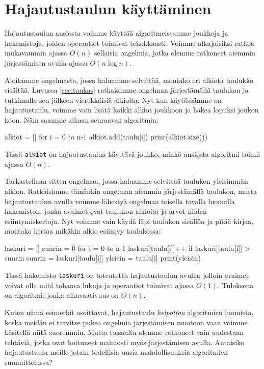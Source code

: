 \section{Hajautustaulun käyttäminen}

Hajautustaulun ansiosta voimme käyttää algoritmeissamme
joukkoja ja hakemistoja, joiden operaatiot toimivat tehokkaasti.
Voimme alkajaisiksi ratkoa mukavammin ajassa $O(n)$ sellaisia ongelmia,
jotka olemme ratkoneet aiemmin järjestämisen avulla ajassa $O(n \log n)$.

Aloitamme ongelmasta, jossa haluamme selvittää,
montako eri alkiota taulukko sisältää.
Luvussa \ref{sec:taukas} ratkaisimme ongelman
järjestämällä taulukon ja tutkimalla sen jälkeen
vierekkäisiä alkioita.
Nyt kun käytös\-sämme on hajautustaulu, voimme vain lisätä
kaikki alkiot joukkoon ja hakea lopuksi joukon koon.
Näin saamme aikaan seuraavan algoritmin:

\begin{code}
alkiot = []
for i = 0 to n-1
    alkiot.add(taulu[i])
print(alkiot.size())
\end{code}

Tässä \texttt{alkiot} on hajautustaulua käyttävä joukko,
minkä ansiosta algoritmi toimii ajassa $O(n)$.

Tarkastellaan sitten ongelmaa, jossa haluamme selvittää
taulukon yleisimmän alkion.
Ratkaisimme tämänkin ongelman aiemmin
järjestä\-mällä taulukon, mutta
hajautustaulun avulla voimme lähestyä ongelmaa
toisella tavalla luomalla hakemiston,
jonka avaimet ovat taulukon alkioita ja arvot niiden
esiintymiskertoja.
Nyt voimme vain käydä läpi taulukon sisällön ja
pitää kirjaa, montako kertaa mikäkin alkio esiintyy taulukossa:

\begin{code}
laskuri = []
suurin = 0
for i = 0 to n-1
    laskuri[taulu[i]]++
    if laskuri[taulu[i]] > suurin
        suurin = laskuri[taulu[i]]
        yleisin = taulu[i]
print(yleisin)
\end{code}

Tässä hakemisto \texttt{laskuri}
on toteutettu hajautustaulun avulla,
jolloin avaimet voivat olla mitä tahansa lukuja
ja operaatiot toimivat ajassa $O(1)$.
Tuloksena on algoritmi, jonka aikavaativuus on $O(n)$.

Kuten nämä esimerkit osoittavat, hajautustaulu
\emph{helpottaa} algoritmien luomista,
koska meidän ei tarvitse pukea ongelmia järjestämisen muotoon
vaan voimme käsitellä niitä suoremmin.
Mutta toisaalta olemme ratkoneet vain uudestaan tehtäviä,
jotka ovat hoituneet mainiosti myös järjestämisen avulla.
Antaisiko hajautustaulu meille jotain todellisia uusia
mahdollisuuksia algoritmien suunnittelussa?

